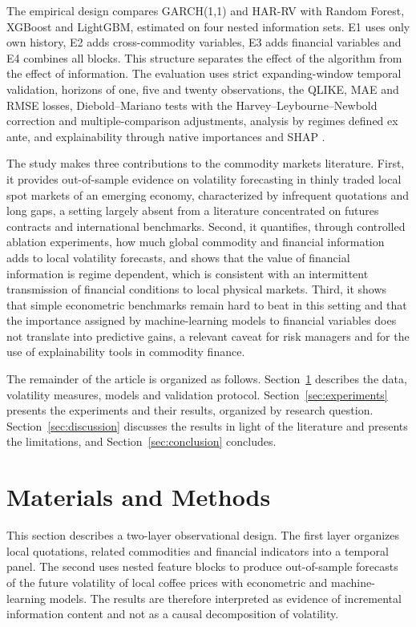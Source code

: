 \documentclass[a4paper,fleqn]{cas-sc}
\begin{document}
The empirical design compares GARCH(1,1) and HAR-RV with Random Forest, XGBoost and LightGBM, estimated on four nested information sets. E1 uses only own history, E2 adds cross-commodity variables, E3 adds financial variables and E4 combines all blocks. This structure separates the effect of the algorithm from the effect of information. The evaluation uses strict expanding-window temporal validation, horizons of one, five and twenty observations, the QLIKE, MAE and RMSE losses, Diebold--Mariano tests with the Harvey--Leybourne--Newbold correction and multiple-comparison adjustments, analysis by regimes defined ex ante, and explainability through native importances and SHAP \citep{Wang2024SystemicRiskML,Diachkov2026FinancialStressML}.

The study makes three contributions to the commodity markets literature. First, it provides out-of-sample evidence on volatility forecasting in thinly traded local spot markets of an emerging economy, characterized by infrequent quotations and long gaps, a setting largely absent from a literature concentrated on futures contracts and international benchmarks. Second, it quantifies, through controlled ablation experiments, how much global commodity and financial information adds to local volatility forecasts, and shows that the value of financial information is regime dependent, which is consistent with an intermittent transmission of financial conditions to local physical markets. Third, it shows that simple econometric benchmarks remain hard to beat in this setting and that the importance assigned by machine-learning models to financial variables does not translate into predictive gains, a relevant caveat for risk managers and for the use of explainability tools in commodity finance.

The remainder of the article is organized as follows. Section~\ref{sec:materials_methods} describes the data, volatility measures, models and validation protocol. Section~\ref{sec:experiments} presents the experiments and their results, organized by research question. Section~\ref{sec:discussion} discusses the results in light of the literature and presents the limitations, and Section~\ref{sec:conclusion} concludes.

\section{Materials and Methods}
\label{sec:materials_methods}

This section describes a two-layer observational design. The first layer organizes local quotations, related commodities and financial indicators into a temporal panel. The second uses nested feature blocks to produce out-of-sample forecasts of the future volatility of local coffee prices with econometric and machine-learning models. The results are therefore interpreted as evidence of incremental information content and not as a causal decomposition of volatility.
\end{document}
